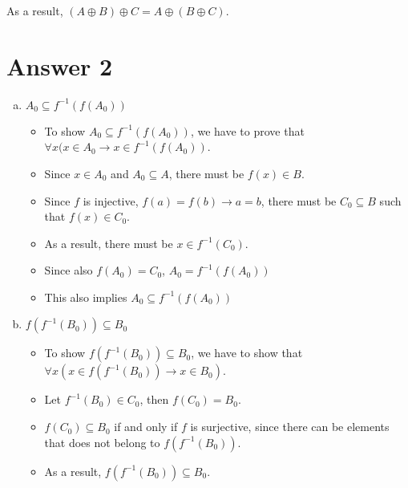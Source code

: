 \documentclass[11pt]{article}
\begin{document}
\begin{enumerate}[a)]
\begin{enumerate}[(i)]
\begin{table}[H]
\begin{tabular}{c|c|c|c|c|c|c}
    \end{tabular}

    As a result, $(A \oplus B) \oplus C = A \oplus (B \oplus C)$. \\
\end{table}
        \end{enumerate}{}
\end{enumerate}{}

\hfill

\section*{Answer 2}

\begin{enumerate}[a)]
    \item 
        $A_0 \subseteq f^{-1}(f(A_0))$
        
        \begin{itemize}
            \item To show $A_0 \subseteq f^{-1}(f(A_0))$, we have to prove that $\forall x(x \in A_0 \rightarrow x \in f^{-1}(f(A_0))$.
            \item Since $x \in A_0$ and $A_0 \subseteq A$, there must be $f(x) \in B$.
            \item Since $f$ is injective, $f(a) = f(b) \rightarrow a = b$, there must be $C_{0} \subseteq B$ such that $f(x) \in C_{0}$.
            \item As a result, there must be $x \in f^{-1}(C_{0})$.
            \item Since also $f(A_0) = C_{0}$, $A_0 = f^{-1}(f(A_0))$
            \item This also implies $A_0 \subseteq f^{-1}(f(A_0))$
        \end{itemize}{}
        
    \item
        $f(f^{-1}(B_0)) \subseteq B_0$
        
        \begin{itemize}
            \item To show $f(f^{-1}(B_0)) \subseteq B_0$, we have to show that $\forall x (x \in f(f^{-1}(B_0)) \rightarrow x \in B_0)$.
            \item Let $f^{-1}(B_0) \in C_0$, then $f(C_0) = B_0$.
            \item $f(C_0) \subseteq B_0$ if and only if $f$ is surjective, since there can be elements that does not belong to $f(f^{-1}(B_0))$.
            \item As a result, $f(f^{-1}(B_0)) \subseteq B_0$.
        \end{itemize}{}
\end{enumerate}{}
\end{document}
